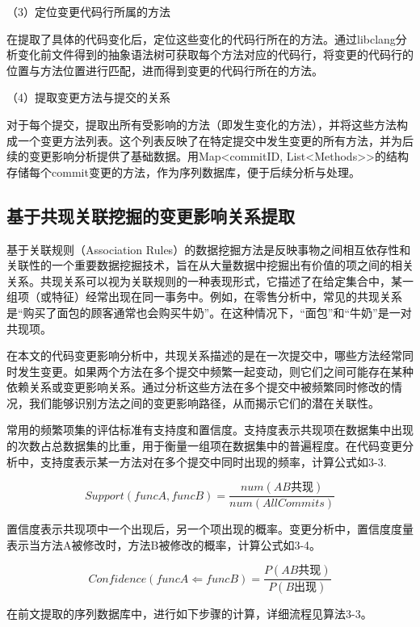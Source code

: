 （3）定位变更代码行所属的方法

在提取了具体的代码变化后，定位这些变化的代码行所在的方法。通过libclang分析变化前文件得到的抽象语法树可获取每个方法对应的代码行，将变更的代码行的位置与方法位置进行匹配，进而得到变更的代码行所在的方法。

（4）提取变更方法与提交的关系

对于每个提交，提取出所有受影响的方法（即发生变化的方法），并将这些方法构成一个变更方法列表。这个列表反映了在特定提交中发生变更的所有方法，并为后续的变更影响分析提供了基础数据。用Map<commitID, List<Methods>>的结构存储每个commit变更的方法，作为序列数据库，便于后续分析与处理。


\subsection{基于共现关联挖掘的变更影响关系提取}

基于关联规则（Association Rules）的数据挖掘方法是反映事物之间相互依存性和关联性的一个重要数据挖掘技术，旨在从大量数据中挖掘出有价值的项之间的相关关系。共现关系可以视为关联规则的一种表现形式，它描述了在给定集合中，某一组项（或特征）经常出现在同一事务中。例如，在零售分析中，常见的共现关系是“购买了面包的顾客通常也会购买牛奶”。在这种情况下，“面包”和“牛奶”是一对共现项。

在本文的代码变更影响分析中，共现关系描述的是在一次提交中，哪些方法经常同时发生变更。如果两个方法在多个提交中频繁一起变动，则它们之间可能存在某种依赖关系或变更影响关系。通过分析这些方法在多个提交中被频繁同时修改的情况，我们能够识别方法之间的变更影响路径，从而揭示它们的潜在关联性。


常用的频繁项集的评估标准有支持度和置信度。支持度表示共现项在数据集中出现的次数占总数据集的比重，用于衡量一组项在数据集中的普遍程度。在代码变更分析中，支持度表示某一方法对在多个提交中同时出现的频率，计算公式如3-3.

\begin{equation}
Support(funcA,funcB)=\frac{num(AB\text{共现})}{num(AllCommits)}
\end{equation}

置信度表示共现项中一个出现后，另一个项出现的概率。变更分析中，置信度度量表示当方法A被修改时，方法B被修改的概率，计算公式如3-4。

\begin{equation}
Confidence(funcA\Leftarrow funcB)=\frac{P(AB\text{共现})}{P(B\text{出现})}
\end{equation}

在前文提取的序列数据库中，进行如下步骤的计算，详细流程见算法3-3。

